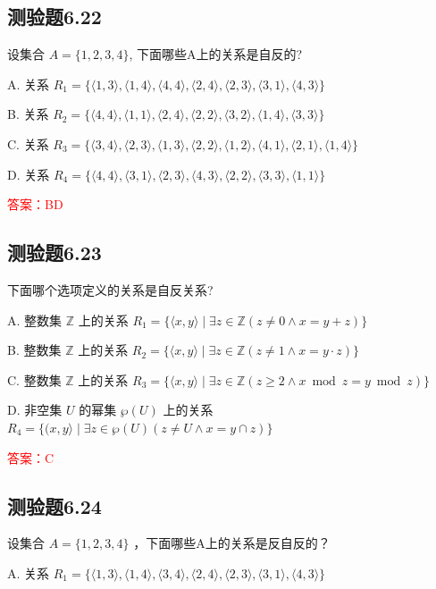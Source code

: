 \documentclass[UTF8, heading=true]{ctexart}
\begin{document}
\subsection{测验题6.22}

设集合 $A=\{1,2,3,4\}$, 下面哪些A上的关系是自反的?

A. 关系 $R_1=\{\langle 1,3\rangle,\langle 1,4\rangle,\langle 4,4\rangle,\langle 2,4\rangle,\langle 2,3\rangle,\langle 3,1\rangle,\langle 4,3\rangle\}$

B. 关系 $R_2=\{\langle 4,4\rangle,\langle 1,1\rangle,\langle 2,4\rangle,\langle 2,2\rangle,\langle 3,2\rangle,\langle 1,4\rangle,\langle 3,3\rangle\}$

C. 关系 $R_3=\{\langle 3,4\rangle,\langle 2,3\rangle,\langle 1,3\rangle,\langle 2,2\rangle,\langle 1,2\rangle,\langle 4,1\rangle,\langle 2,1\rangle,\langle 1,4\rangle\}$

D. 关系 $R_4=\{\langle 4,4\rangle,\langle 3,1\rangle,\langle 2,3\rangle,\langle 4,3\rangle,\langle 2,2\rangle,\langle 3,3\rangle,\langle 1,1\rangle\}$

\textcolor{red}{答案：BD}

\subsection{测验题6.23}
下面哪个选项定义的关系是自反关系?

A. 
整数集 $\mathbb{Z}$ 上的关系 $R_1=\{\langle x, y\rangle \mid \exists z \in \mathbb{Z}(z \neq 0 \wedge x=y+z)\}$

B. 
整数集 $\mathbb{Z}$ 上的关系 $R_2=\{\langle x, y\rangle \mid \exists z \in \mathbb{Z}(z \neq 1 \wedge x=y \cdot z)\}$

C. 
整数集 $\mathbb{Z}$ 上的关系 $R_3=\{\langle x, y\rangle \mid \exists z \in \mathbb{Z}(z \geq 2 \wedge x \bmod z=y \bmod z)\}$

D. 
非空集 $U$ 的幂集 $\wp(U)$ 上的关系 $R_4=\{(x, y\rangle \mid \exists z \in \wp(U)(z \neq U \wedge x=y \cap z)\}$

\textcolor{red}{答案：C}

\subsection{测验题6.24}

设集合 $A=\{1,2,3,4\}$ ，下面哪些A上的关系是反自反的？

A. 关系 $R_1=\{\langle 1,3\rangle,\langle 1,4\rangle,\langle 3,4\rangle,\langle 2,4\rangle,\langle 2,3\rangle,\langle 3,1\rangle,\langle 4,3\rangle\}$
\end{document}

